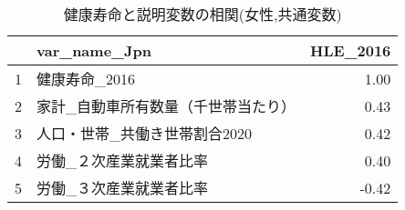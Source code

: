 \begin{table}[H]
\centering
\caption{健康寿命と説明変数の相関(女性,共通変数)}
\label{HLE_d_common_f_corr.tex}
\begingroup\tiny

\begin{adjustbox}{width=.5\textwidth}
\begin{tabular}{rlr}
  \hline
 & var\_name\_Jpn & HLE\_2016 \\
  \hline
1 & 健康寿命\_2016 & 1.00 \\
  2 & 家計\_自動車所有数量（千世帯当たり） & 0.43 \\
  3 & 人口・世帯\_共働き世帯割合2020 & 0.42 \\
  4 & 労働\_２次産業就業者比率 & 0.40 \\
  5 & 労働\_３次産業就業者比率 & -0.42 \\
   \hline
\end{tabular}
\end{adjustbox}

\endgroup
\end{table}
